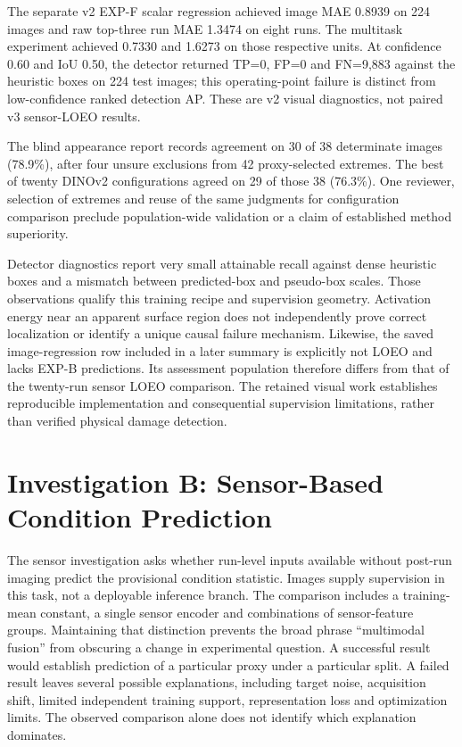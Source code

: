 The separate v2 EXP-F scalar regression achieved image MAE 0.8939 on 224 images
and raw top-three run MAE 1.3474 on eight runs. The multitask experiment achieved
0.7330 and 1.6273 on those respective units. At confidence 0.60 and IoU 0.50,
the detector returned TP=0, FP=0 and FN=9,883 against the heuristic boxes on 224 test
images; this operating-point failure is distinct from low-confidence ranked detection
AP. These are v2 visual diagnostics, not paired v3 sensor-LOEO results.

The blind appearance report records agreement on 30 of 38 determinate images (78.9\%),
after four unsure exclusions from 42 proxy-selected extremes. The best of twenty
DINOv2 configurations agreed on 29 of those 38 (76.3\%). One reviewer, selection of
extremes and reuse of the same judgments for configuration comparison preclude
population-wide validation or a claim of established method superiority.

Detector diagnostics report very small attainable recall against dense heuristic boxes
and a mismatch between predicted-box and pseudo-box scales. Those observations qualify
this training recipe and supervision geometry. Activation energy near an apparent
surface region does not independently prove correct localization or identify a unique
causal failure mechanism. Likewise, the saved image-regression row included in a later
summary is explicitly not LOEO and lacks EXP-B predictions. Its assessment population
therefore differs from that of the twenty-run sensor LOEO comparison. The retained
visual work establishes reproducible implementation and consequential supervision
limitations, rather than verified physical damage detection.

\section{Investigation B: Sensor-Based Condition Prediction}
The sensor investigation asks whether run-level inputs available without post-run
imaging predict the provisional condition statistic. Images supply supervision in this
task, not a deployable inference branch. The comparison includes a training-mean
constant, a single sensor encoder and combinations of sensor-feature groups. Maintaining
that distinction prevents the broad phrase ``multimodal fusion'' from obscuring a change
in experimental question. A successful result would establish prediction of a particular
proxy under a particular split. A failed result leaves several possible explanations,
including target noise, acquisition shift, limited independent training support,
representation loss and optimization limits. The observed comparison alone does not
identify which explanation dominates.


